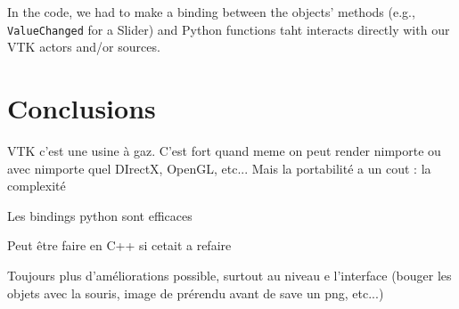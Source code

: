 \documentclass[10pt,twocolumn,letterpaper]{article}
\def\code#1{\texttt{#1}}
\begin{document}
In the code, we had to make a binding between the objects' methods (e.g.,
\code{ValueChanged} for a Slider) and Python functions taht interacts directly with
our VTK actors and/or sources.

\section*{Conclusions}

VTK c'est une usine à gaz. C'est fort quand meme on peut render nimporte ou avec
nimporte quel DIrectX, OpenGL, etc... Mais la portabilité a un cout : la complexité

Les bindings python sont efficaces

Peut être faire en C++ si cetait a refaire

Toujours plus d'améliorations possible, surtout au niveau e l'interface
(bouger les objets avec la souris, image de prérendu avant de save un png, etc...)


\end{document}
